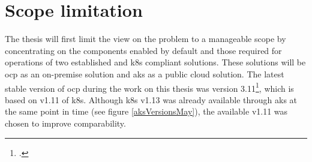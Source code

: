 \section{Scope limitation} \label{scopeLimit}

The thesis will first limit the view on the problem to a manageable scope by concentrating on the components enabled by default and those required for operations of two established and \gls{k8s} compliant solutions.
These solutions will be \gls{ocp} as an on-premise solution and \gls{aks} as a public cloud solution. 
The latest stable version of \gls{ocp} during the work on this thesis was version 3.11\footcite[][, see headline and date]{ocpRelease}, which is based on v1.11 of \gls{k8s}.
Although \gls{k8s} v1.13 was already available through \gls{aks} at the same point in time (see figure \ref{aksVersionsMay}), the available v1.11 was chosen to improve comparability.

